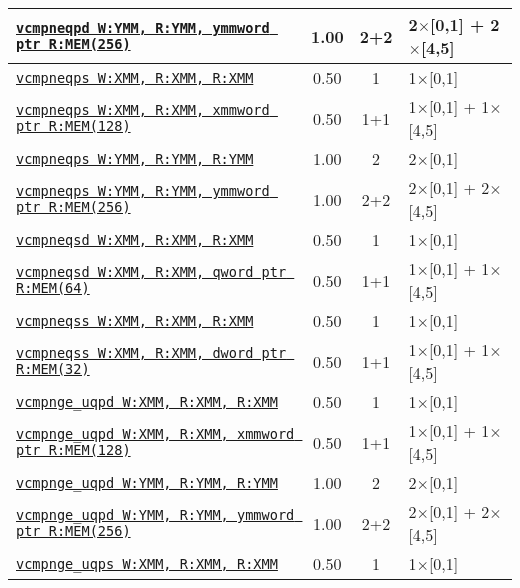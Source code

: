 \documentclass[a4paper,english,fontsize=9]{scrartcl}
\begin{document}
\begin{longtable}{p{}ccL{.25\textwidth}}
  \midrule
  \texttt{\href{https://felixcloutier.com/x86/CMPPD.html}{vcmpneqpd W:YMM, R:YMM, ymmword ptr R:MEM(256)}} & 1.00 & 2+2 & 2\(\times\)[0,1] + 2\(\times\)[4,5] \\
  \midrule
  \texttt{\href{https://felixcloutier.com/x86/CMPPS.html}{vcmpneqps W:XMM, R:XMM, R:XMM}} & 0.50 & 1 & 1\(\times\)[0,1] \\
  \midrule
  \texttt{\href{https://felixcloutier.com/x86/CMPPS.html}{vcmpneqps W:XMM, R:XMM, xmmword ptr R:MEM(128)}} & 0.50 & 1+1 & 1\(\times\)[0,1] + 1\(\times\)[4,5] \\
  \midrule
  \texttt{\href{https://felixcloutier.com/x86/CMPPS.html}{vcmpneqps W:YMM, R:YMM, R:YMM}} & 1.00 & 2 & 2\(\times\)[0,1] \\
  \midrule
  \texttt{\href{https://felixcloutier.com/x86/CMPPS.html}{vcmpneqps W:YMM, R:YMM, ymmword ptr R:MEM(256)}} & 1.00 & 2+2 & 2\(\times\)[0,1] + 2\(\times\)[4,5] \\
  \midrule
  \texttt{\href{https://felixcloutier.com/x86/CMPSD.html}{vcmpneqsd W:XMM, R:XMM, R:XMM}} & 0.50 & 1 & 1\(\times\)[0,1] \\
  \midrule
  \texttt{\href{https://felixcloutier.com/x86/CMPSD.html}{vcmpneqsd W:XMM, R:XMM, qword ptr R:MEM(64)}} & 0.50 & 1+1 & 1\(\times\)[0,1] + 1\(\times\)[4,5] \\
  \midrule
  \texttt{\href{https://felixcloutier.com/x86/CMPSS.html}{vcmpneqss W:XMM, R:XMM, R:XMM}} & 0.50 & 1 & 1\(\times\)[0,1] \\
  \midrule
  \texttt{\href{https://felixcloutier.com/x86/CMPSS.html}{vcmpneqss W:XMM, R:XMM, dword ptr R:MEM(32)}} & 0.50 & 1+1 & 1\(\times\)[0,1] + 1\(\times\)[4,5] \\
  \midrule
  \texttt{\href{https://felixcloutier.com/x86/CMPPD.html}{vcmpnge\_uqpd W:XMM, R:XMM, R:XMM}} & 0.50 & 1 & 1\(\times\)[0,1] \\
  \midrule
  \texttt{\href{https://felixcloutier.com/x86/CMPPD.html}{vcmpnge\_uqpd W:XMM, R:XMM, xmmword ptr R:MEM(128)}} & 0.50 & 1+1 & 1\(\times\)[0,1] + 1\(\times\)[4,5] \\
  \midrule
  \texttt{\href{https://felixcloutier.com/x86/CMPPD.html}{vcmpnge\_uqpd W:YMM, R:YMM, R:YMM}} & 1.00 & 2 & 2\(\times\)[0,1] \\
  \midrule
  \texttt{\href{https://felixcloutier.com/x86/CMPPD.html}{vcmpnge\_uqpd W:YMM, R:YMM, ymmword ptr R:MEM(256)}} & 1.00 & 2+2 & 2\(\times\)[0,1] + 2\(\times\)[4,5] \\
  \midrule
  \texttt{\href{https://felixcloutier.com/x86/CMPPS.html}{vcmpnge\_uqps W:XMM, R:XMM, R:XMM}} & 0.50 & 1 & 1\(\times\)[0,1] \\

\end{longtable}
\end{document}
